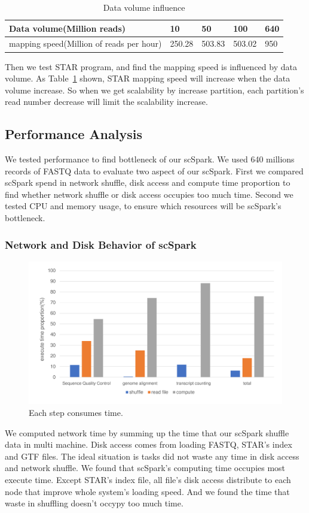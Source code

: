 \documentclass[runningheads]{llncs}
\begin{document}
\begin{table}
  \centering
  \caption{Data volume influence}\label{tab3}
  \begin{tabular}{l | l | l | l | l}
  \hline
  Data volume(Million reads) & 10 & 50 & 100 & 640 \\
  \hline
  mapping speed(Million of reads per hour) & 250.28 & 503.83 & 503.02 & 950 \\
  \hline
  \end{tabular}
\end{table}

Then we test STAR program, and find the mapping speed is influenced by data volume.
As Table~\ref{tab3} shown, STAR mapping speed will increase when the data volume increase.
So when we get scalability by increase partition, each partition's read number decrease will limit the scalability increase.

\subsection{Performance Analysis}
We tested performance to find bottleneck of our scSpark.
We used 640 millions records of FASTQ data to evaluate two aspect of our scSpark.
First we compared scSpark spend in network shuffle, disk access and compute time proportion to find whether network shuffle or disk access occupies too much time.
Second we tested CPU and memory usage, to ensure which resources will be scSpark's bottleneck.

\subsubsection{Network and Disk Behavior of scSpark}
\begin{figure}
  \includegraphics[width=\textwidth]{fig7.pdf}
  \caption{Each step consumes time.} \label{fig7}
\end{figure}
We computed network time by summing up the time that our scSpark shuffle data in multi machine.
Disk access comes from loading FASTQ, STAR's index and GTF files.
The ideal situation is tasks did not waste any time in disk access and network shuffle.
We found that scSpark's computing time occupies most execute time.
Except STAR's index file, all file's disk access distribute to each node that improve whole system's loading speed.
And we found the time that waste in shuffling doesn't occypy too much time.
\end{document}
